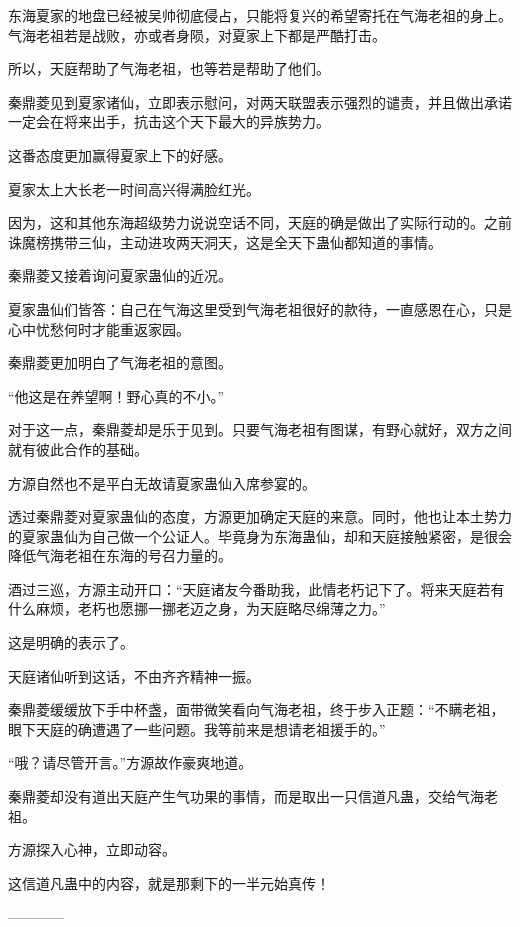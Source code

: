 \begin{this_body}
东海夏家的地盘已经被吴帅彻底侵占，只能将复兴的希望寄托在气海老祖的身上。气海老祖若是战败，亦或者身陨，对夏家上下都是严酷打击。

所以，天庭帮助了气海老祖，也等若是帮助了他们。

秦鼎菱见到夏家诸仙，立即表示慰问，对两天联盟表示强烈的谴责，并且做出承诺一定会在将来出手，抗击这个天下最大的异族势力。

这番态度更加赢得夏家上下的好感。

夏家太上大长老一时间高兴得满脸红光。

因为，这和其他东海超级势力说说空话不同，天庭的确是做出了实际行动的。之前诛魔榜携带三仙，主动进攻两天洞天，这是全天下蛊仙都知道的事情。

秦鼎菱又接着询问夏家蛊仙的近况。

夏家蛊仙们皆答：自己在气海这里受到气海老祖很好的款待，一直感恩在心，只是心中忧愁何时才能重返家园。

秦鼎菱更加明白了气海老祖的意图。

“他这是在养望啊！野心真的不小。”

对于这一点，秦鼎菱却是乐于见到。只要气海老祖有图谋，有野心就好，双方之间就有彼此合作的基础。

方源自然也不是平白无故请夏家蛊仙入席参宴的。

透过秦鼎菱对夏家蛊仙的态度，方源更加确定天庭的来意。同时，他也让本土势力的夏家蛊仙为自己做一个公证人。毕竟身为东海蛊仙，却和天庭接触紧密，是很会降低气海老祖在东海的号召力量的。

酒过三巡，方源主动开口：“天庭诸友今番助我，此情老朽记下了。将来天庭若有什么麻烦，老朽也愿挪一挪老迈之身，为天庭略尽绵薄之力。”

这是明确的表示了。

天庭诸仙听到这话，不由齐齐精神一振。

秦鼎菱缓缓放下手中杯盏，面带微笑看向气海老祖，终于步入正题：“不瞒老祖，眼下天庭的确遭遇了一些问题。我等前来是想请老祖援手的。”

“哦？请尽管开言。”方源故作豪爽地道。

秦鼎菱却没有道出天庭产生气功果的事情，而是取出一只信道凡蛊，交给气海老祖。

方源探入心神，立即动容。

这信道凡蛊中的内容，就是那剩下的一半元始真传！

------------

\end{this_body}

